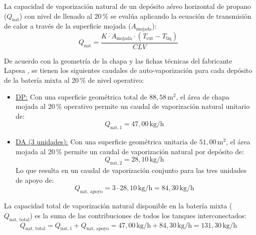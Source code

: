 \documentclass[12pt]{article}
\begin{document}
        La capacidad de vaporización natural de un depósito aéreo horizontal de propano ($Q_{\text{nat}}$) con nivel de llenado al 20\,\% se evalúa aplicando la ecuación de transmisión de calor a través de la superficie mojada ($A_{\text{mojada}}$):
        \begin{equation}
            Q_{\text{nat}} = \frac{K \cdot A_{\text{mojada}} \cdot (T_{\text{ext}} - T_{\text{liq}})}{CLV}
        \end{equation}

        De acuerdo con la geometría de la chapa y las fichas técnicas del fabricante Lapesa \cite{lapesa}, se tienen los siguientes caudales de auto-vaporización para cada depósito de la batería mixta al 20\,\% de nivel operativo:
        \begin{itemize}
            \item \underline{DP:}
            Con una superficie geométrica total de $88,58\,\text{m}^2$, el área de chapa mojada al 20\,\% operativo permite un caudal de vaporización natural unitario de:
            \begin{equation}
                Q_{\text{nat}, 1} = 47,00\,\text{kg/h}
            \end{equation}
            \item \underline{DA (3 unidades):}
            Con una superficie geométrica unitaria de $51,00\,\text{m}^2$, el área mojada al 20\,\% permite un caudal de vaporización natural por depósito de:
            \begin{equation}
                Q_{\text{nat}, 2} = 28,10\,\text{kg/h}
            \end{equation}
            Lo que resulta en un caudal de vaporización conjunto para las tres unidades de apoyo de:
            \begin{equation}
                Q_{\text{nat, apoyo}} = 3 \cdot 28,10\,\text{kg/h} = 84,30\,\text{kg/h}
            \end{equation}
        \end{itemize}

        La capacidad total de vaporización natural disponible en la batería mixta ($Q_{\text{nat, total}}$) es la suma de las contribuciones de todos los tanques interconectados:
        \begin{equation}
            Q_{\text{nat, total}} = Q_{\text{nat}, 1} + Q_{\text{nat, apoyo}} = 47,00\,\text{kg/h} + 84,30\,\text{kg/h} = 131,30\,\text{kg/h}
        \end{equation}
\end{document}
